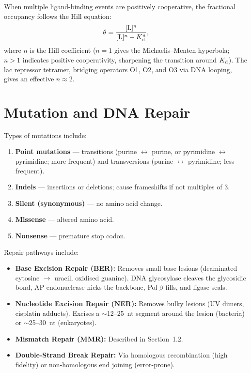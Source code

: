 \documentclass[12pt, a4paper, oneside]{report}
\begin{document}
When multiple ligand-binding events are positively cooperative, the
fractional occupancy follows the Hill equation:
\begin{equation}
  \theta = \frac{[\mathrm{L}]^n}{[\mathrm{L}]^n + K_{\mathrm{d}}^n},
  \label{eq:hill}
\end{equation}
where $n$ is the Hill coefficient ($n=1$ gives the Michaelis--Menten
hyperbola; $n > 1$ indicates positive cooperativity, sharpening the
transition around $K_{\mathrm{d}}$). The lac repressor tetramer, bridging operators
O1, O2, and O3 via DNA looping, gives an effective $n \approx 2$.

\section{Mutation and DNA Repair}

Types of mutations include:
\begin{enumerate}
  \item \textbf{Point mutations} — transitions (purine $\leftrightarrow$
        purine, or pyrimidine $\leftrightarrow$ pyrimidine; more frequent)
        and transversions (purine $\leftrightarrow$ pyrimidine; less frequent).
  \item \textbf{Indels} — insertions or deletions; cause frameshifts if
        not multiples of 3.
  \item \textbf{Silent (synonymous)} — no amino acid change.
  \item \textbf{Missense} — altered amino acid.
  \item \textbf{Nonsense} — premature stop codon.
\end{enumerate}

Repair pathways include:
\begin{itemize}
  \item \textbf{Base Excision Repair (BER):} Removes small base lesions
        (deaminated cytosine $\to$ uracil, oxidised guanine). DNA glycosylase
        cleaves the glycosidic bond, AP endonuclease nicks the backbone,
        Pol $\beta$ fills, and ligase seals.
  \item \textbf{Nucleotide Excision Repair (NER):} Removes bulky lesions
        (UV dimers, cisplatin adducts). Excises a $\sim$12--25~nt segment
        around the lesion (bacteria) or $\sim$25--30~nt (eukaryotes).
  \item \textbf{Mismatch Repair (MMR):} Described in Section~1.2.
  \item \textbf{Double-Strand Break Repair:} Via homologous recombination
        (high fidelity) or non-homologous end joining (error-prone).
\end{itemize}
\end{document}
